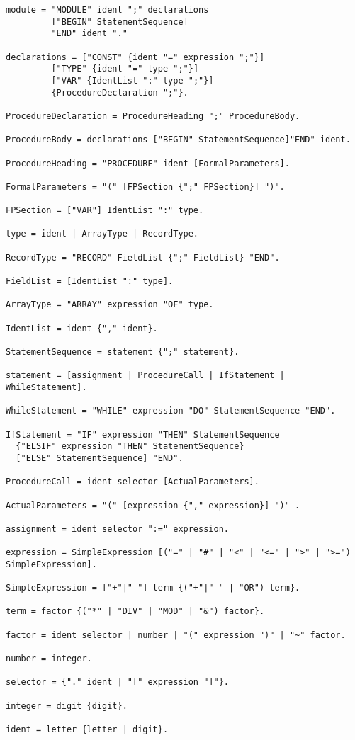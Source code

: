 \documentclass[12pt]{article}
\begin{document}
{\scriptsize
\begin{lstlisting}[style=EBNF]
module = "MODULE" ident ";" declarations 
         ["BEGIN" StatementSequence] 
         "END" ident "."

declarations = ["CONST" {ident "=" expression ";"}]
         ["TYPE" {ident "=" type ";"}] 
         ["VAR" {IdentList ":" type ";"}] 
         {ProcedureDeclaration ";"}.

ProcedureDeclaration = ProcedureHeading ";" ProcedureBody. 

ProcedureBody = declarations ["BEGIN" StatementSequence]"END" ident. 

ProcedureHeading = "PROCEDURE" ident [FormalParameters]. 

FormalParameters = "(" [FPSection {";" FPSection}] ")".

FPSection = ["VAR"] IdentList ":" type.

type = ident | ArrayType | RecordType.

RecordType = "RECORD" FieldList {";" FieldList} "END".

FieldList = [IdentList ":" type].

ArrayType = "ARRAY" expression "OF" type.

IdentList = ident {"," ident}.

StatementSequence = statement {";" statement}.

statement = [assignment | ProcedureCall | IfStatement | WhileStatement].

WhileStatement = "WHILE" expression "DO" StatementSequence "END". 

IfStatement = "IF" expression "THEN" StatementSequence
  {"ELSIF" expression "THEN" StatementSequence}
  ["ELSE" StatementSequence] "END".

ProcedureCall = ident selector [ActualParameters]. 

ActualParameters = "(" [expression {"," expression}] ")" . 

assignment = ident selector ":=" expression. 

expression = SimpleExpression [("=" | "#" | "<" | "<=" | ">" | ">=") SimpleExpression].

SimpleExpression = ["+"|"-"] term {("+"|"-" | "OR") term}. 

term = factor {("*" | "DIV" | "MOD" | "&") factor}. 

factor = ident selector | number | "(" expression ")" | "~" factor. 

number = integer.

selector = {"." ident | "[" expression "]"}.

integer = digit {digit}.

ident = letter {letter | digit}. 
\end{lstlisting}}
\end{document}

